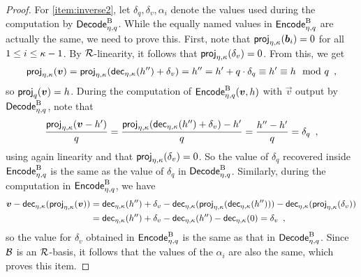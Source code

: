 \begin{proof}
\bigskip\noindent
For \autoref{item:inverse2}, let $\delta_q, \delta_v, \alpha_i$ denote the values used during the computation by $\mathsf{Decode}^{\textup{B}}_{\eta,q}$.
While the equally named values in $\mathsf{Encode}^{\textup{B}}_{\eta,q}$ are actually the same, we need to prove this.
First, note that $\mathsf{proj}_{\eta,\kappa}(\boldsymbol{b}_i) = 0$ for all $1\leq i \leq \kappa-1$.
By $\mathcal{R}$-linearity, it follows that $\mathsf{proj}_{\eta,\kappa}(\delta_v) = 0$. From this, we get
\[
 \mathsf{proj}_{\eta,\kappa}(\boldsymbol{v}) = \mathsf{proj}_{\eta,\kappa}(\mathsf{dec}_{\eta,\kappa}(h'') + \delta_v) = h'' = h' + q\cdot \delta_q \equiv h' \equiv h \mod q\enspace,
\]
so $\mathsf{proj}_{q}(\boldsymbol{v}) = h$.
During the computation of $\mathsf{Encode}^{\textup{B}}_{\eta,q}(\boldsymbol{v}, h)$ with $\vec{v}$ output by $\mathsf{Decode}^{\textup{B}}_{\eta,q}$, note that
\[
 \frac{\mathsf{proj}_{\eta,\kappa}(\boldsymbol{v} - h')}{q} = \frac{\mathsf{proj}_{\eta,\kappa}(\mathsf{dec}_{\eta,\kappa}(h'')+\delta_v)-h'}{q} = \frac{h''-h'}{q} = \delta_q\enspace,
\]
using again linearity and that $\mathsf{proj}_{\eta,\kappa}(\delta_v) = 0$.
So the value of $\delta_q$ recovered inside $\mathsf{Encode}^{\textup{B}}_{\eta,q}$ is the same as the value of $\delta_q$ in $\mathsf{Decode}^{\textup{B}}_{\eta,q}$.
Similarly, during the computation in $\mathsf{Encode}^{\textup{B}}_{\eta,q}$, we have
\begin{align*}
 \boldsymbol{v}-\mathsf{dec}_{\eta,\kappa}(\mathsf{proj}_{\eta,\kappa}(\boldsymbol{v})) ={}& \mathsf{dec}_{\eta,\kappa}(h'') + \delta_v - \mathsf{dec}_{\eta,\kappa}(\mathsf{proj}_{\eta,\kappa}(\mathsf{dec}_{\eta,\kappa}(h''))) - \mathsf{dec}_{\eta,\kappa}(\mathsf{proj}_{\eta,\kappa}(\delta_v))\\
 ={}&\mathsf{dec}_{\eta,\kappa}(h'') + \delta_v - \mathsf{dec}_{\eta,\kappa}(h'') - \mathsf{dec}_{\eta,\kappa}(0) = \delta_v\enspace,
\end{align*}
so the value for $\delta_v$ obtained in $\mathsf{Encode}^{\textup{B}}_{\eta,q}$ is the same as that in $\mathsf{Decode}^{\textup{B}}_{\eta,q}$.
Since $\mathcal{B}$ is an $\mathcal{R}$-basis, it follows that the values of the $\alpha_i$ are also the same, which proves this item.


\end{proof}
